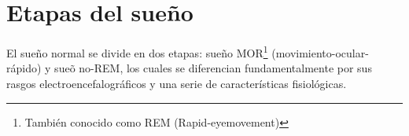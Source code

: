 

\section{Etapas del sue\~no}

El sue\~no normal se divide en dos etapas: sue\~no  MOR\footnote{Tambi\'en conocido como
REM (Rapid-eyemovement)} (movimiento-ocular-r\'apido) y sue\~o no-REM, los cuales se diferencian 
fundamentalmente por sus rasgos electroencefalogr\'aficos y una serie de caracter\'isticas 
fisiol\'ogicas\cite{AASM07}.


